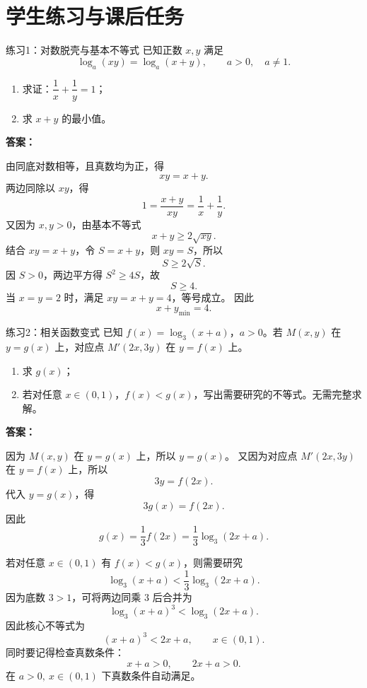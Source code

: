 \documentclass[11pt,a4paper]{ctexart}
\begin{document}
\section{学生练习与课后任务}

\begin{exbox}{练习1：对数脱壳与基本不等式}
已知正数 $x,y$ 满足
\[
\log_a(xy)=\log_a(x+y),\qquad a>0,
\quad a\ne1.
\]
\begin{enumerate}[label=(\arabic*)]
  \item 求证：$\dfrac1x+\dfrac1y=1$；
  \item 求 $x+y$ 的最小值。
\end{enumerate}
\end{exbox}

\begin{graynote}
\textbf{答案：}

由同底对数相等，且真数均为正，得
\[
xy=x+y.
\]
两边同除以 $xy$，得
\[
1=\frac{x+y}{xy}=\frac1x+\frac1y.
\]
又因为 $x,y>0$，由基本不等式
\[
x+y\ge2\sqrt{xy}.
\]
结合 $xy=x+y$，令 $S=x+y$，则 $xy=S$，所以
\[
S\ge2\sqrt S.
\]
因 $S>0$，两边平方得 $S^2\ge4S$，故
\[
S\ge4.
\]
当 $x=y=2$ 时，满足 $xy=x+y=4$，等号成立。
因此
\[
\boxed{x+y_{\min}=4}.
\]
\end{graynote}

\begin{exbox}{练习2：相关函数变式}
已知 $f(x)=\log_3(x+a)$，$a>0$。若 $M(x,y)$ 在 $y=g(x)$ 上，对应点 $M'(2x,3y)$ 在 $y=f(x)$ 上。
\begin{enumerate}[label=(\arabic*)]
  \item 求 $g(x)$；
  \item 若对任意 $x\in(0,1)$，$f(x)<g(x)$，写出需要研究的不等式。无需完整求解。
\end{enumerate}
\end{exbox}

\begin{graynote}
\textbf{答案：}

因为 $M(x,y)$ 在 $y=g(x)$ 上，所以 $y=g(x)$。
又因为对应点 $M'(2x,3y)$ 在 $y=f(x)$ 上，所以
\[
3y=f(2x).
\]
代入 $y=g(x)$，得
\[
3g(x)=f(2x).
\]
因此
\[
\boxed{
g(x)=\frac13 f(2x)=\frac13\log_3(2x+a)}.
\]

若对任意 $x\in(0,1)$ 有 $f(x)<g(x)$，则需要研究
\[
\log_3(x+a)<\frac13\log_3(2x+a).
\]
因为底数 $3>1$，可将两边同乘 $3$ 后合并为
\[
\log_3(x+a)^3<\log_3(2x+a).
\]
因此核心不等式为
\[
\boxed{(x+a)^3<2x+a,\qquad x\in(0,1).}
\]
同时要记得检查真数条件：
\[
x+a>0,\qquad 2x+a>0.
\]
在 $a>0,\ x\in(0,1)$ 下真数条件自动满足。
\end{graynote}
\end{document}
